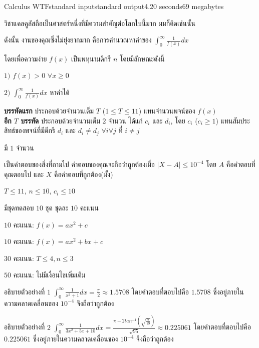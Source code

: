 \documentclass[11pt,a4paper]{article}
\begin{document}
\begin{problem}{Calculus WTF}{standard input}{standard output}{4.20 seconds}{69 megabytes}

วิชาแคลคูลัสถือเป็นศาสตร์หนึ่งที่มีความสำคัญต่อโลกใบนี้มาก ผมก็คิดเช่นนั้น

ดังนั้น งานของคุณซึ่งไม่ยุ่งยากมาก คือการคำนวณหาค่าของ $\int_{0}^{\infty}\frac{1}{f(x)}dx$

โดยเพื่อความง่าย $f(x)$ เป็นพหุนามดีกรี $n$ โดยมีลักษณะดังนี้

$1)$ $f(x) > 0$ $\forall x \ge 0$

$2)$ $\int_{0}^{\infty}\frac{1}{f(x)}dx$ หาค่าได้

\InputFile

\textbf{บรรทัดแรก} ประกอบด้วยจำนวนเต็ม $T$  ($1 \leq T \leq 11$) แทนจำนวนพจน์ของ $f(x)$ \\ 
\textbf{อีก $T$ บรรทัด} ประกอบด้วยจำนวนเต็ม $2$ จำนวน ได้แก่ $c_i$ และ $d_i$, โดย $c_i$ ($c_i \ge 1$) แทนสัมประสิทธ์ของพจน์ที่มีดีกรี $d_i$ และ $d_i \ne d_j$ $\forall i\forall j$ ที่ $i\ne j$ 

\OutputFile
มี $1$ จำนวน

เป็นคำตอบของสิ่งที่ถามไป คำตอบของคุณจะถือว่าถูกต้องเมื่อ $\lvert X-A\rvert \le 10^{-4}$ โดย $A$ คือคำตอบที่คุณตอบไป และ $X$ คือคำตอบที่ถูกต้อง(มั้ง)

\Scoring
$T \le 11$, $n \le 10$, $c_i \le 10$

มีชุดทดสอบ $10$ ชุด ชุดละ $10$ คะแนน

$10$ คะแนน: $f(x) = ax^2 + c$

$10$ คะแนน: $f(x) = ax^2 + bx + c$

$30$ คะแนน: $T\le 4, n\le 3$

$50$ คะแนน: ไม่มีเงื่อนไขเพิ่มเติม

\Examples

\begin{example}
%
\end{example}

อธิบายตัวอย่างที่ $1$ $\int_{0}^{\infty}\frac{1}{x^2+1}dx = \frac{\pi}{2} \approx 1.5708$ โดยคำตอบที่ตอบไปคือ $1.5708$ ซึ่งอยู่ภายในความคลาดเคลื่อนของ $10^{-4}$ จึงถือว่าถูกต้อง 

อธิบายตัวอย่างที่ $2$ $\int_{0}^{\infty}\frac{1}{3x^2+5x+10}dx = \frac{\pi - 2 tan^{-1}(\sqrt{\frac{5}{19}})}{\sqrt{95}} \approx 0.225061$ โดยคำตอบที่ตอบไปคือ $0.225061$ ซึ่งอยู่ภายในความคลาดเคลื่อนของ $10^{-4}$ จึงถือว่าถูกต้อง

\end{problem}
\end{document}
